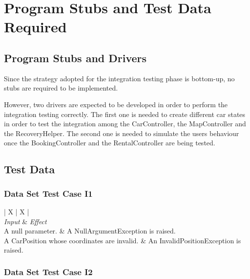 \chapter{Program Stubs and Test Data Required}

\section{Program Stubs and Drivers}
Since the strategy adopted for the integration testing phase is bottom-up, no stubs are required to be implemented.

However, two drivers are expected to be developed in order to perform the integration testing correctly. The first one is needed to create different car states in order to test the integration among the CarController, the MapController and the RecoveryHelper. The second one is needed to simulate the users behaviour once the BookingController and the RentalController are being tested.

\section{Test Data}

\subsection{Data Set Test Case I1}

\begin{table}[H]
	\begin{tabularx}{\textwidth}{| X | X |}
		\hline
			\\	\hline
		\textit{Input}	&	\textit{Effect}	\\	\hline
			A null parameter.	&	A NullArgumentException is raised.\\	\hline
			A CarPosition whose coordinates are invalid.	&	An InvalidPositionException is raised.\\	\hline
	\end{tabularx}
	\captionsetup{textformat=empty,labelformat=blank}
	\caption{Data Set Test Case I1}
	\label{table:data-set-table-1}
\end{table}

\subsection{Data Set Test Case I2}

